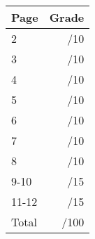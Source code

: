 \documentclass[12pt]{article}
\begin{document}
\begin{table}[hbt]
\begin{center}
\begin{tabular}{|l|r|} \hline
Page&Grade\\
\hline \hline
\cline{1-2} 2 & \enspace\enspace\enspace\enspace\enspace\enspace/10\\
\cline{1-2} 3 & \enspace\enspace\enspace\enspace\enspace\enspace/10\\
\cline{1-2} 4 & \enspace\enspace\enspace\enspace\enspace\enspace/10\\
\cline{1-2} 5 & \enspace\enspace\enspace\enspace\enspace\enspace/10\\
\cline{1-2} 6 & \enspace\enspace\enspace\enspace\enspace\enspace/10\\
\cline{1-2} 7 & \enspace\enspace\enspace\enspace\enspace\enspace/10\\
\cline{1-2} 8 & \enspace\enspace\enspace\enspace\enspace\enspace/10\\
\cline{1-2} 9-10 & \enspace\enspace\enspace\enspace\enspace\enspace/15\\
\cline{1-2} 11-12 & \enspace\enspace\enspace\enspace\enspace\enspace/15\\
\cline{1-2} Total & \enspace\enspace\enspace\enspace\enspace\enspace/100\\
\hline
\end{tabular}


\end{center}
\end{table}
\newpage
\end{document}
